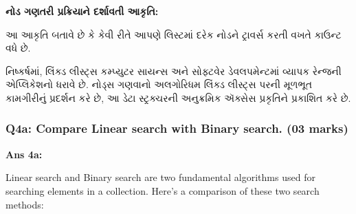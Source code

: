 \textbf{નોડ ગણતરી પ્રક્રિયાને દર્શાવતી આકૃતિ:}

\begin{Shaded}
\begin{Highlighting}[]
\end{Highlighting}
\end{Shaded}

આ આકૃતિ બતાવે છે કે કેવી રીતે આપણે લિસ્ટમાં દરેક નોડને ટ્રાવર્સ કરતી વખતે કાઉન્ટ વધે છે.

નિષ્કર્ષમાં, લિંક્ડ લીસ્ટ્સ કમ્પ્યુટર સાયન્સ અને સોફ્ટવેર ડેવલપમેન્ટમાં વ્યાપક રેન્જની
એપ્લિકેશનો ધરાવે છે. નોડ્સ ગણવાનો અલગોરિધમ લિંક્ડ લીસ્ટ્સ પરની મૂળભૂત કામગીરીનું
પ્રદર્શન કરે છે, આ ડેટા સ્ટ્રક્ચરની અનુક્રમિક ઍક્સેસ પ્રકૃતિને પ્રકાશિત કરે છે.

\hypertarget{q4a-compare-linear-search-with-binary-search.-03-marks}{%
\subsubsection{Q4a: Compare Linear search with Binary search. (03
marks)}\label{q4a-compare-linear-search-with-binary-search.-03-marks}}

\textbf{Ans 4a:}

Linear search and Binary search are two fundamental algorithms used for
searching elements in a collection. Here's a comparison of these two
search methods:

